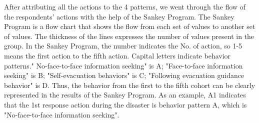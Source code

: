 After attributing all the actions to the 4 patterns, we went through the flow of the respondents' actions with the help of the Sankey Program. The Sankey Program is a flow chart that shows the flow from each set of values to another set of values. The thickness of the lines expresses the number of values present in the group. In the Sankey Program, the number indicates the No. of action, so 1-5 means the first action to the fifth action. Capital letters indicate behavior patterns." No-face-to-face information seeking" is A; "Face-to-face information seeking" is B; "Self-evacuation behaviors" is C; "Following evacuation guidance behavior" is D. Thus, the behavior from the first to the fifth cohort can be clearly represented in the results of the Sankey Program. As an example, A1 indicates that the 1st response action during the disaster is behavior pattern A, which is "No-face-to-face information seeking".




























